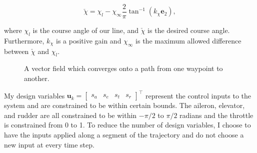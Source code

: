 \documentclass[letterpaper, 10 pt, conference]{ieeeconf}  %
\begin{document}
\begin{equation}
\check{\chi}=\chi_{l}-\chi_{\infty}\frac{2}{\pi}\tan^{-1}\left(k_{\chi}\mathbf{e}_{2}\right),
\end{equation}

where $\chi_l$ is the course angle of our line, and $\check{\chi}$ is the desired course angle. Furthermore, $k_\chi$ is a positive gain and $\chi_\infty$ is the maximum allowed difference between $\check{\chi}$ and $\chi_l$.


\begin{figure}
	\centering
	\caption{A vector field which converges onto a path from one waypoint to another.}
	\label{fig:vet_field}
	
\end{figure}

My design variables $\mathbf{u}_k =\begin{bmatrix}s_{a} & s_{e} & s_{t} & s_{r}\end{bmatrix}^{\top}$ represent the control inputs to the system and are constrained to be within certain bounds. The aileron, elevator, and rudder are all constrained to be within $-\pi/2$ to $\pi/2$ radians and the throttle is constrained from 0 to 1. To reduce the number of design variables, I choose to have the inputs applied along a segment of the trajectory and do not choose a new input at every time step. 
\end{document}
